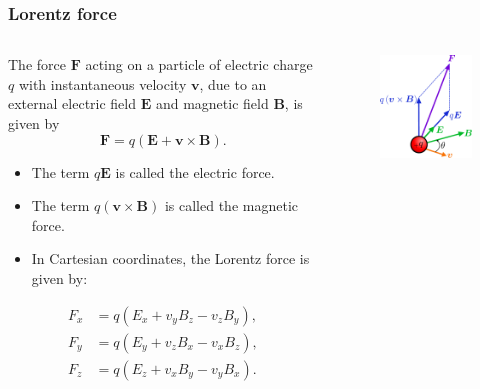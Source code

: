 \begin{frame}
	\frametitle{Lorentz force}
    \begin{columns}
		\begin{column}{0.6\textwidth}
        The force $\bm{F}$ acting on a particle of electric charge $q$ with instantaneous velocity $\bm{v}$, due to an external electric field $\bm{E}$ and magnetic field $\bm{B}$, is given by
            \begin{equation}
                \bm{F} = q\left(\bm{E} + \bm{v}\times\bm{B}\right).
            \end{equation}
            \begin{itemize}
                \item The term $q\bm{E}$  is called the electric force.
                \item The term $q\left(\bm{v}\times\bm{B}\right)$ is called the magnetic force.
                \item In Cartesian coordinates, the Lorentz force is given by:
            \end{itemize}
            \begin{equation}
                \begin{aligned}
                    F_x &= q\left(E_x + v_yB_z - v_zB_y\right),\\
                    F_y &= q\left(E_y + v_zB_x - v_xB_z\right),\\
                    F_z &= q\left(E_z + v_xB_y - v_yB_x\right).
                \end{aligned}
            \end{equation}
		\end{column}
        \hfill
		\begin{column}{0.40\textwidth}
			\begin{figure}
				\centering
				\includegraphics[height=0.5\textheight]{fig/lec02/Lorentz_force_particle.pdf}

\end{figure}
\end{column}
\end{columns}
\end{frame}
